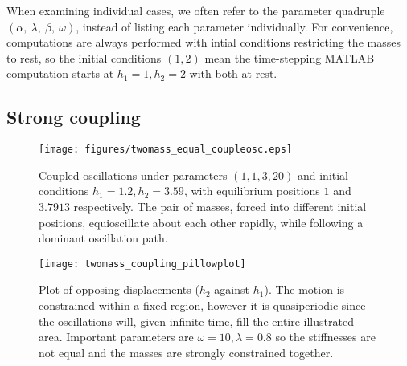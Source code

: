 \documentclass{article}
\begin{document}
When examining individual cases, we often refer to the parameter quadruple \((\alpha,~\lambda,~\beta,~\omega)\), instead of listing each parameter individually.
For convenience, computations are always performed with intial conditions restricting the masses to rest,
so the initial conditions \((1,2)\) mean the time-stepping MATLAB computation starts at $h_1=1,h_2=2$ with both at rest.

\subsection{Strong coupling}

\begin{figure}
    \centering
    \texttt{[image: figures/twomass\_equal\_coupleosc.eps]}
    \caption{Coupled oscillations under parameters \((1, 1, 3, 20)\) and initial conditions \(h_1 = 1.2, h_2 = 3.59\),
    with equilibrium positions \(1\) and \(3.7913\) respectively. The pair of masses, forced into different initial positions,
    equioscillate about each other rapidly, while following a dominant oscillation path.}
    \label{fig:twomass_dominant_osc}
\end{figure}
\begin{figure}
    \centering
    \texttt{[image: twomass\_coupling\_pillowplot]}
    \caption{
        Plot of opposing displacements ($h_2$ against $h_1$). The motion is constrained within a fixed region,
        however it is quasiperiodic since the oscillations will, given infinite time, fill the entire illustrated area.
        Important parameters are \(\omega = 10, \lambda = 0.8\) so the stiffnesses are not equal and the masses are strongly constrained together.
    }
    \label{fig:twomass_quasiperiodic}
\end{figure} %
\end{document}
